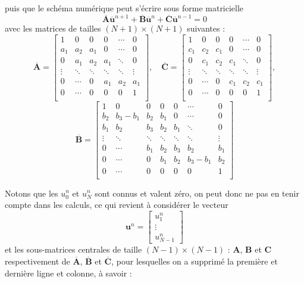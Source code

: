 \documentclass[a4,12pt]{article}
\newcommand{\A}{\mathbf{A}}
\newcommand{\B}{\mathbf{B}}
\newcommand{\C}{\mathbf{C}}
\newcommand{\ub}{\mathbf{u}}
\begin{document}
  puis que le schéma numérique peut s'écrire sous forme matricielle
  \begin{equation}
    \overline{\A} \overline{\ub}^{n+1}+\overline{\B} \overline{\ub}^n+\overline{\C} \overline{\ub}^{n-1}=0
  \end{equation} 
  avec les matrices de tailles $(N+1)\times (N+1)$ suivantes : 
  \[
    \overline{\A}=
    \begin{bmatrix}
      1 & 0 & 0 & 0 & \cdots & 0 \\ 
      a_1 & a_2 & a_1 & 0 & \cdots & 0 \\ 
      0 & a_1 & a_2 & a_1 & \ddots & 0 \\
      \vdots & \ddots & \ddots & \ddots & \ddots & \vdots \\ 
      0 & \cdots & 0 & a_1 & a_2 & a_1\\ 
      0 & \cdots & 0 & 0 & 0 & 1 \\
    \end{bmatrix},\quad 
    \overline{\C}=
    \begin{bmatrix}
      1 & 0 & 0 & 0 & \cdots & 0 \\ 
      c_1 & c_2 & c_1 & 0 & \cdots & 0 \\
      0 & c_1 & c_2 & c_1 & \ddots & 0 \\ 
      \vdots & \ddots & \ddots & \ddots & \ddots & \vdots \\
      0 & \cdots & 0 & c_1 & c_2 & c_1 \\
      0 & \cdots & 0 & 0 & 0 & 1 \\
    \end{bmatrix},
  \]
  \[ 
    \overline{\B}=
    \begin{bmatrix}
      1 & 0 & 0 & 0 & 0  & \cdots & 0 \\ 
      b_2 & b_3-b_1 & b_2 & b_1 & 0 & \cdots & 0 \\ 
      b_1 & b_2 & b_3 & b_2 & b_1 & \ddots & 0 \\
      \vdots & \ddots & \ddots & \ddots & \ddots & \ddots & \vdots \\ 
      0 & \cdots & b_1 & b_2 & b_3 & b_2 & b_1 \\ 
      0 & \cdots &  0 & b_1 & b_2 & b_3-b_1 & b_2 \\ 
      0 & \cdots & 0 & 0 &  0 & 0 & 1 \\
    \end{bmatrix}
  \]


  Notons que les $u_0^n$ et $u_{N}^n$ sont connus et valent zéro, on peut donc ne pas en tenir compte dans les calculs, ce qui revient à considérer le vecteur 
  \[
    \ub^n=\begin{bmatrix}u_1^n\\ \vdots \\ u_{N-1}^n\end{bmatrix}
  \]
  et les sous-matrices centrales de taille $(N-1)\times (N-1)$ : $\A$, $\B$ et $\C$ respectivement de $\overline{\A}$, $\overline{\B}$ et $\overline{\C}$, pour lesquelles on a supprimé la première et dernière ligne et colonne, à savoir :
\end{document}
